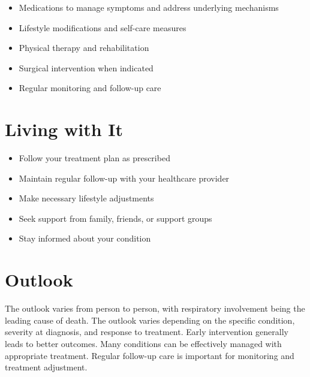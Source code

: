 \begin{itemize}[noitemsep]
  \item Medications to manage symptoms and address underlying mechanisms
  \item Lifestyle modifications and self-care measures
  \item Physical therapy and rehabilitation
  \item Surgical intervention when indicated
  \item Regular monitoring and follow-up care
\end{itemize}
\section{Living with It}
\begin{itemize}[noitemsep]
  \item Follow your treatment plan as prescribed
  \item Maintain regular follow-up with your healthcare provider
  \item Make necessary lifestyle adjustments
  \item Seek support from family, friends, or support groups
  \item Stay informed about your condition
\end{itemize}
\section{Outlook}
The outlook varies from person to person, with respiratory involvement being the leading cause of death. The outlook varies depending on the specific condition, severity at diagnosis, and response to treatment. Early intervention generally leads to better outcomes. Many conditions can be effectively managed with appropriate treatment. Regular follow-up care is important for monitoring and treatment adjustment.
